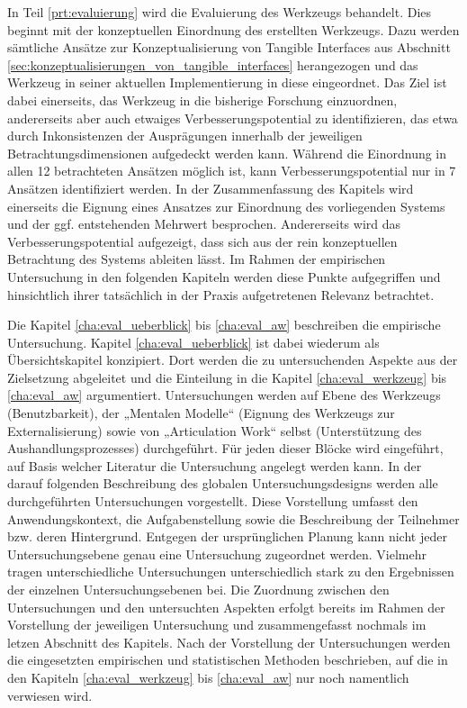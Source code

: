 In Teil \ref{prt:evaluierung} wird die Evaluierung des Werkzeugs behandelt. Dies beginnt mit der konzeptuellen Einordnung des erstellten Werkzeugs. Dazu werden sämtliche Ansätze zur Konzeptualisierung von Tangible Interfaces aus Abschnitt \ref{sec:konzeptualisierungen_von_tangible_interfaces} herangezogen und das Werkzeug in seiner aktuellen Implementierung in diese eingeordnet. Das Ziel ist dabei einerseits, das Werkzeug in die bisherige Forschung einzuordnen, andererseits aber auch etwaiges Verbesserungspotential zu identifizieren, das etwa durch Inkonsistenzen der Ausprägungen innerhalb der jeweiligen Betrachtungsdimensionen aufgedeckt werden kann. Während die Einordnung in allen 12 betrachteten Ansätzen möglich ist, kann Verbesserungspotential nur in 7 Ansätzen identifiziert werden. In der Zusammenfassung des Kapitels wird einerseits die Eignung eines Ansatzes zur Einordnung des vorliegenden Systems und der ggf. entstehenden Mehrwert besprochen. Andererseits wird das Verbesserungspotential aufgezeigt, dass sich aus der rein konzeptuellen Betrachtung des Systems ableiten lässt. Im Rahmen der empirischen Untersuchung in den folgenden Kapiteln werden diese Punkte aufgegriffen und hinsichtlich ihrer tatsächlich in der Praxis aufgetretenen Relevanz betrachtet.

Die Kapitel \ref{cha:eval_ueberblick} bis \ref{cha:eval_aw} beschreiben die empirische Untersuchung. Kapitel \ref{cha:eval_ueberblick} ist dabei wiederum als Übersichtskapitel konzipiert. Dort werden die zu untersuchenden Aspekte aus der Zielsetzung abgeleitet und die Einteilung in die Kapitel \ref{cha:eval_werkzeug} bis \ref{cha:eval_aw} argumentiert. Untersuchungen werden auf Ebene des Werkzeugs (Benutzbarkeit), der „Mentalen Modelle“ (Eignung des Werkzeugs zur Externalisierung) sowie von „Articulation Work“ selbst (Unterstützung des Aushandlungsprozesses) durchgeführt. Für jeden dieser Blöcke wird eingeführt, auf Basis welcher Literatur die Untersuchung angelegt werden kann. In der darauf folgenden Beschreibung des globalen Untersuchungsdesigns werden alle durchgeführten Untersuchungen vorgestellt. Diese Vorstellung umfasst den Anwendungskontext, die Aufgabenstellung sowie die Beschreibung der Teilnehmer bzw. deren Hintergrund. Entgegen der ursprünglichen Planung kann nicht jeder Untersuchungsebene genau eine Untersuchung zugeordnet werden. Vielmehr tragen unterschiedliche Untersuchungen unterschiedlich stark zu den Ergebnissen der einzelnen Untersuchungsebenen bei. Die Zuordnung zwischen den Untersuchungen und den untersuchten Aspekten erfolgt bereits im Rahmen der Vorstellung der jeweiligen Untersuchung und zusammengefasst nochmals im letzen Abschnitt des Kapitels. Nach der Vorstellung der Untersuchungen werden die eingesetzten empirischen und statistischen Methoden beschrieben, auf die in den Kapiteln \ref{cha:eval_werkzeug} bis \ref{cha:eval_aw} nur noch namentlich verwiesen wird.

